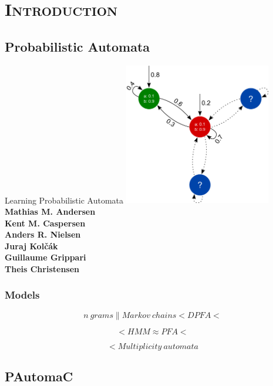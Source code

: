 \section{\scshape Introduction}
\subsection{Probabilistic Automata}

\begin{frame}
	\begin{center}
		\Large{Learning Probabilistic Automata}
		\includegraphics[width=0.48\textwidth]{images/frontpagemodel.pdf}\\
		\small{\textbf{Mathias M. Andersen\\
		Kent M. Caspersen\\
		Anders R. Nielsen\\
		Juraj Kol\v{c}\'{a}k\\
		Guillaume Grippari\\
		Theis Christensen\\}}
	\end{center}
\end{frame}

\begin{frame}
	\begin{center}
		\frametitle{Models}
		
		$$n~grams \parallel Markov~chains < DPFA <$$
		
		$$< HMM \approx PFA <$$
		
		$$< Multiplicity~automata$$
	\end{center}
\end{frame}

\subsection{PAutomaC}

